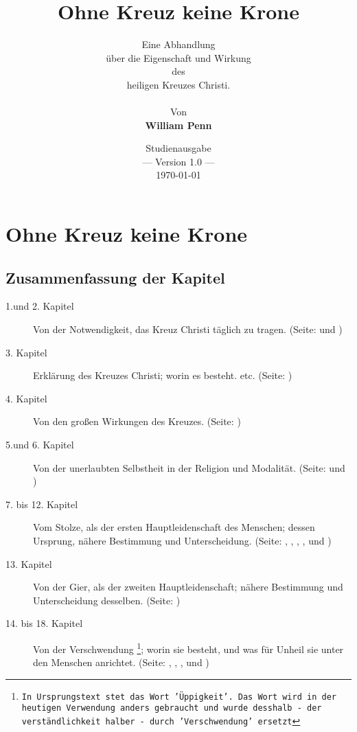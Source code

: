 \documentclass[a5paper,pagesize,9pt]{scrbook}
\begin{document}
\author{
Eine Abhandlung \\
über die Eigenschaft und Wirkung
\\
des
\\
heiligen Kreuzes Christi.
\\
\\
Von
\\
\textbf{William Penn}
}

\title{Ohne Kreuz keine Krone}
\date{Studienausgabe \\ --- Version 1.0 --- \\ \today}

\maketitle

\frontmatter

\tableofcontents




\mainmatter
\part{Ohne Kreuz keine Krone}



\chapter{Zusammenfassung der Kapitel}
\begin{description}
\item[1.und 2. Kapitel] Von der Notwendigkeit, das Kreuz Christi täglich zu
tragen. (Seite: \pageref{kap1} und  \pageref{kap2})
\item[3. Kapitel] Erklärung des Kreuzes Christi; worin es besteht. etc. (Seite:
\pageref{kap3})
\item[4. Kapitel] Von den großen Wirkungen des Kreuzes. (Seite: \pageref{kap4})
\item[5.und 6. Kapitel] Von der unerlaubten Selbstheit in der Religion und
Modalität. (Seite: \pageref{kap5} und \pageref{kap6})
\item[7. bis 12. Kapitel] Vom Stolze, als der ersten Hauptleidenschaft des
Menschen; dessen Ursprung, nähere Bestimmung und Unterscheidung. (Seite:
\pageref{kap7}, \pageref{kap8}, \pageref{kap9}, \pageref{kap10}, \pageref{kap11}
und \pageref{kap12})
\item[13. Kapitel] Von der Gier, als der zweiten Hauptleidenschaft; nähere
Bestimmung und Unterscheidung desselben. (Seite: \pageref{kap13})
\item[14. bis 18. Kapitel] Von der Verschwendung
\footnote{\texttt{In Ursprungstext stet
das Wort 'Üppigkeit'. Das Wort wird in der heutigen Verwendung anders
gebraucht und wurde desshalb - der verständlichkeit halber - durch
'Verschwendung' ersetzt}}; worin sie besteht, und was für Unheil sie unter den
Menschen anrichtet. (Seite: \pageref{kap14}, \pageref{kap15} , \pageref{kap16} ,
\pageref{kap17} und \pageref{kap18})
\end{description}
\end{document}
